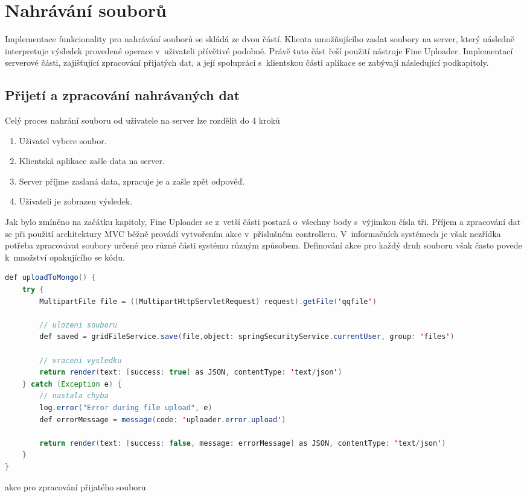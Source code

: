 \section{Nahrávání souborů}
Implementace funkcionality pro nahrávání souborů se skládá ze dvou částí. Klienta umožňujícího zaslat soubory na server, který následně interpretuje výsledek provedené operace v~uživateli přívětivé podobně. Právě tuto část řeší použití nástroje Fine Uploader\cite{fu-homepage}. Implementací serverové části, zajišťující zpracování přijatých dat, a její spolupráci s~klientskou části aplikace se zabývají následující podkapitoly.

\subsection{Přijetí a zpracování nahrávaných dat}
Celý proces nahrání souboru od uživatele na server lze rozdělit do 4 kroků
\begin{enumerate}
\item Uživatel vybere soubor.
\item Klientská aplikace zašle data na server.
\item Server příjme zaslaná data, zpracuje je a zašle zpět odpověď.
\item Uživateli je zobrazen výsledek.
\end{enumerate}

Jak bylo zmíněno na začátku kapitoly, Fine Uploader se z~vetší části postará o~všechny body s~výjimkou čísla tři. Příjem a zpracování dat se při použití architektury MVC běžně provádí vytvořením akce v~příslušném controlleru. V~informačních systémech je však nezřídka potřeba zpracovávat soubory určené pro různé části systému různým způsobem. Definování akce  pro každý druh souboru však často povede k~množství opakujícího se kódu.

\begin{example}
\centering
\begin{lstlisting}[language=Java]
def uploadToMongo() {
    try {
        MultipartFile file = ((MultipartHttpServletRequest) request).getFile('qqfile')

        // ulozeni souboru
        def saved = gridFileService.save(file,object: springSecurityService.currentUser, group: 'files')

        // vraceni vysledku
        return render(text: [success: true] as JSON, contentType: 'text/json')
    } catch (Exception e) {
        // nastala chyba
        log.error("Error during file upload", e)
        def errorMessage = message(code: 'uploader.error.upload')

        return render(text: [success: false, message: errorMessage] as JSON, contentType: 'text/json')
    }
}
\end{lstlisting}
\caption{akce pro zpracování přijatého souboru}
\end{example}

